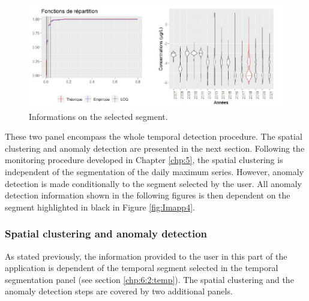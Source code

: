 \begin{figure}[htbp]
  \centering
  \includegraphics[]{figs/Chap6/Im_appbis5.pdf}
  \caption{Informations on the selected segment.}
  \label{fig:Imapp5}
\end{figure}

These two panel encompass the whole temporal detection procedure. The spatial clustering and anomaly detection are presented in the next section. Following the monitoring procedure developed in Chapter \ref{chp:5}, the spatial clustering is independent of the segmentation of the daily maximum series. However, anomaly detection is made conditionally to the segment selected by the user. All anomaly detection information shown in the following figures is then dependent on the segment highlighted in black in Figure \ref{fig:Imapp4}.



\subsubsection{Spatial clustering and anomaly detection}\label{chp:6:2:spat}


As stated previously, the information provided to the user in this part of the application is dependent of the temporal segment selected in the temporal segmentation panel (see section \ref{chp:6:2:temp}). The spatial clustering and the anomaly detection steps are covered by two additional panels. 

